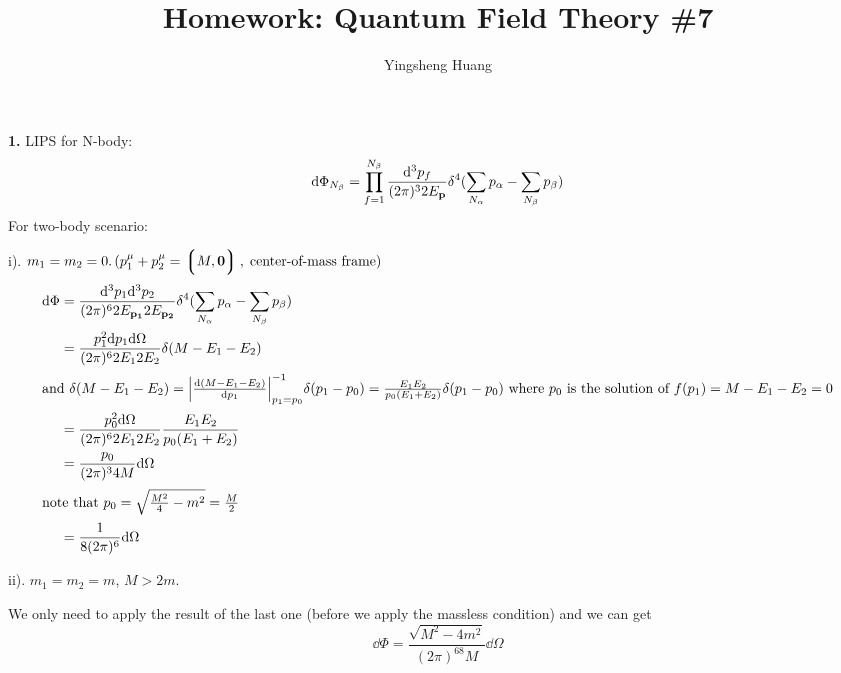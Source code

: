 \documentclass{article}
\title{Homework: Quantum Field Theory \#7}
\author{Yingsheng Huang}
\begin{document}
\maketitle
{\bf1.}\quad
LIPS for N-body:
$$\dd\Phi_{N_{\beta}}=\prod_{f=1}^{N_{\beta}}\frac{\dd^3p_f}{(2\pi)^32E_{\vb{p}}}\delta^4(\sum_{N_{\alpha}}p_{\alpha}-\sum_{N_{\beta}} p_{\beta})$$
For two-body scenario:

i). $m_1=m_2=0.\,(p_1^{\mu}+p_2^{\mu}=\Pmqty{M,\vb{0}},\;\text{center-of-mass frame})$
\begin{align*}
  \dd\Phi&=\frac{\dd^3p_1\dd^3p_2}{(2\pi)^62E_{\vb{p_1}}2E_{\vb{p_2}}}\delta^4(\sum_{N_{\alpha}}p_{\alpha}-\sum_{N_{\beta}} p_{\beta})\\
  &=\frac{p_1^2\dd p_1\dd\Omega}{(2\pi)^62E_12E_2}\delta(M-E_1-E_2)\\
  \intertext{and $\delta(M-E_1-E_2)=\abs{\dv{(M-E_1-E_2)}{p_1}}^{-1}_{p_1=p_0}\delta(p_1-p_0)=\frac{E_1E_2}{p_0(E_1+E_2)}\delta(p_1-p_0)$ where $p_0$ is the solution of $f(p_1)=M-E_1-E_2=0$}
  &=\frac{p_0^2\dd\Omega}{(2\pi)^62E_12E_2}\frac{E_1E_2}{p_0(E_1+E_2)}\\
  &=\frac{p_0}{(2\pi)^34M}\dd\Omega\\
  \intertext{note that $p_0=\sqrt{\frac{M^2}{4}-m^2}=\frac{M}{2}$}
  &=\frac{1}{8(2\pi)^6}\dd\Omega
\end{align*}

ii). $m_1=m_2=m$, $M>2m$.

We only need to apply the result of the last one (before we apply the massless condition) and we can get
$$\dd\Phi=\frac{\sqrt{M^2-4m^2}}{(2\pi)^68M}\dd\Omega$$
\end{document}
